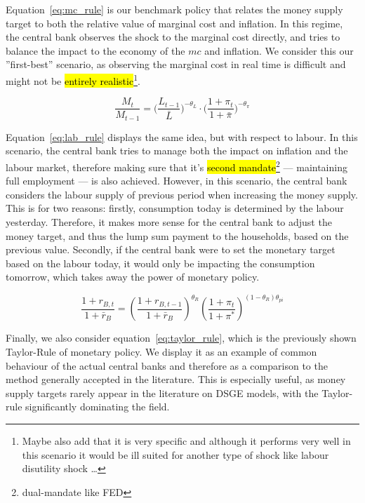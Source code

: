 \documentclass[12pt]{article}
\begin{document}
Equation~\ref{eq:mc_rule} is our benchmark policy that relates the money supply target to both the relative value of marginal cost and inflation. In this regime, the central bank observes the shock to the marginal cost directly, and tries to balance the impact to the economy of the $mc$ and inflation. We consider this our ''first-best'' scenario, as observing the marginal cost in real time is difficult and might not be \hl{entirely realistic}\footnote{Maybe also add that it is very specific and although it performs very well in this scenario it  would be ill suited for another type of shock like labour disutility shock \dots}.

\begin{equation}\label{eq:lab_rule}
    \frac{M_t}{M_{t-1}}
        = \Big(\frac{L_{t-1}}{\bar{L}}\Big)^{-\theta_L}
          \cdot \Big(\frac{1 + \pi_t}{1 + \bar{\pi}}\Big)^{-\theta_{\pi}}
\end{equation}

Equation~\ref{eq:lab_rule} displays the same idea, but with respect to labour. In this scenario, the central bank tries to manage both the impact on inflation and the labour market, therefore making sure that it's \hl{second mandate}\footnote{dual-mandate like FED} --- maintaining full employment --- is also achieved. However, in this scenario, the central bank considers the labour supply of previous period when increasing the money supply. This is for two reasons: firstly, consumption today is determined by the labour yesterday. Therefore, it makes more sense for the central bank to adjust the money target, and thus the lump sum payment to the households, based on the previous value. Secondly, if the central bank were to set the monetary target based on the labour today, it would only be impacting the consumption tomorrow, which takes away the power of monetary policy.  

\begin{equation}\label{eq:taylor_rule}
    \frac{1 + r_{B,t}}{1 + \bar{r}_B} = \left( \frac{1 + r_{B,t-1}}{1 + \bar{r}_B} \right)^{\theta_R} \left( \frac{1 + \pi_t}{1 + \pi^*} \right)^{(1 - \theta_R)\theta_{pi}}
\end{equation}

Finally, we also consider equation~\ref{eq:taylor_rule}, which is the previously shown Taylor-Rule of monetary policy. We display it as an example of common behaviour of the actual central banks and therefore as a comparison to the method generally accepted in the literature. This is especially useful, as money supply targets rarely appear in the literature on DSGE models, with the Taylor-rule significantly dominating the field.  
\end{document}
